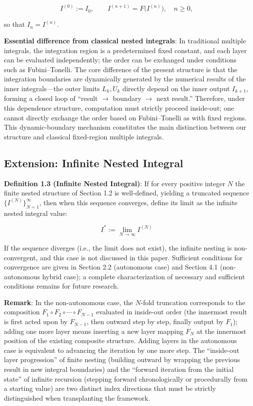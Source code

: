 \documentclass[11pt,a4paper]{amsart}
\begin{document}
\begin{equation}
\label{eq:convention}
I^{(0)} := I_0, \qquad I^{(n+1)} = F\bigl(I^{(n)}\bigr), \quad n \ge 0,
\end{equation}

so that $I_n = I^{(n)}$.

\textbf{Essential difference from classical nested integrals}: In traditional multiple integrals, the integration region is a predetermined fixed constant, and each layer can be evaluated independently; the order can be exchanged under conditions such as Fubini--Tonelli. The core difference of the present structure is that the integration boundaries are dynamically generated by the numerical results of the inner integrals---the outer limits $L_k, U_k$ directly depend on the inner output $I_{k+1}$, forming a closed loop of ``result $\to$ boundary $\to$ next result.'' Therefore, under this dependence structure, computation must strictly proceed inside-out; one cannot directly exchange the order based on Fubini--Tonelli as with fixed regions. This dynamic-boundary mechanism constitutes the main distinction between our structure and classical fixed-region multiple integrals.

\subsection{Extension: Infinite Nested Integral}

\textbf{Definition 1.3 (Infinite Nested Integral)}: If for every positive integer $N$ the finite nested structure of Section 1.2 is well-defined, yielding a truncated sequence $\{I^{(N)}\}_{N=1}^\infty$, then when this sequence converges, define its limit as the infinite nested integral value:

\begin{equation}
\label{eq:infinite-nested}
I^* := \lim_{N \to \infty} I^{(N)}
\end{equation}

If the sequence diverges (i.e., the limit does not exist), the infinite nesting is non-convergent, and this case is not discussed in this paper. Sufficient conditions for convergence are given in Section 2.2 (autonomous case) and Section 4.1 (non-autonomous hybrid case); a complete characterization of necessary and sufficient conditions remains for future research.

\textbf{Remark}: In the non-autonomous case, the $N$-fold truncation corresponds to the composition $F_1 \circ F_2 \circ \cdots \circ F_{N-1}$ evaluated in inside-out order (the innermost result is first acted upon by $F_{N-1}$, then outward step by step, finally output by $F_1$); adding one more layer means inserting a new layer mapping $F_N$ at the innermost position of the existing composite structure. Adding layers in the autonomous case is equivalent to advancing the iteration by one more step. The ``inside-out layer progression'' of finite nesting (building outward by wrapping the previous result in new integral boundaries) and the ``forward iteration from the initial state'' of infinite recursion (stepping forward chronologically or procedurally from a starting value) are two distinct index directions that must be strictly distinguished when transplanting the framework.
\end{document}
